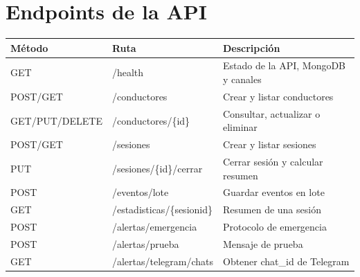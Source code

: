 \documentclass[11pt,a4paper]{article}
\newcommand{\codigoguion}{\textunderscore\allowbreak}
\newcommand{\codigo}[1]{{\small\ttfamily\let\_\codigoguion #1}}
\begin{document}
\section{Endpoints de la API}
\begin{table}[H]
\centering
\begin{tabularx}{\textwidth}{l l X}
\toprule
\textbf{Método} & \textbf{Ruta} & \textbf{Descripción}\\
\midrule
GET & \codigo{/health} & Estado de la API, MongoDB y canales\\
POST/GET & \codigo{/conductores} & Crear y listar conductores\\
GET/PUT/DELETE & \codigo{/conductores/\{id\}} & Consultar, actualizar o eliminar\\
POST/GET & \codigo{/sesiones} & Crear y listar sesiones\\
PUT & \codigo{/sesiones/\{id\}/cerrar} & Cerrar sesión y calcular resumen\\
POST & \codigo{/eventos/lote} & Guardar eventos en lote\\
GET & \codigo{/estadisticas/\{sesion\_id\}} & Resumen de una sesión\\
POST & \codigo{/alertas/emergencia} & Protocolo de emergencia\\
POST & \codigo{/alertas/prueba} & Mensaje de prueba\\
GET & \codigo{/alertas/telegram/chats} & Obtener chat\_id de Telegram\\
\bottomrule
\end{tabularx}
\end{table}
\end{document}
